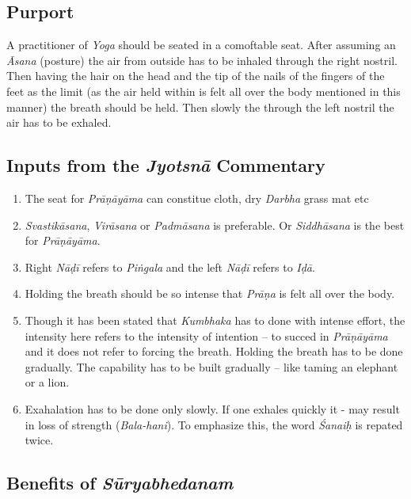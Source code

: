 \subsection*{Purport}

A practitioner of \textit{Yoga} should be seated in a comoftable seat. After assuming an \textit{Āsana} (posture) the air from outside has to be inhaled through the right nostril.  Then having the hair on the head and the tip of the nails of the fingers of the feet as the limit (as the air held within is felt all over the body mentioned in this manner) the breath should be held. Then slowly the through the left nostril the air has to be exhaled. 

\subsection*{Inputs from the \textit{Jyotsnā} Commentary}

\begin{enumerate}
\itemsep=0pt
\item The seat for \textit{Prāṇāyāma} can constitue cloth, dry \textit{Darbha} grass mat etc
\item \textit{Svastikāsana}, \textit{Virāsana} or \textit{Padmāsana} is preferable. Or \textit{Siddhāsana} is the best for \textit{Prāṇāyāma}. 
\item Right \textit{Nāḍī} refers to \textit{Piṅgala} and the left \textit{Nāḍī} refers to \textit{Iḍā}. 
\item Holding the breath should be so intense that \textit{Prāṇa} is felt all over the body. 
\item Though it has been stated that \textit{Kumbhaka} has to done with intense effort, the intensity here refers to the intensity of intention – to succed in \textit{Prāṇāyāma} and it does not refer to forcing the breath. Holding the breath has to be done gradually. The capability has to be built gradually – like taming an elephant or a lion. 
\item Exahalation has to be done only slowly. If one exhales quickly it - may result in loss of strength (\textit{Bala-hani}). To emphasize this, the word \textit{Śanaiḥ} is repated twice.       
\end{enumerate}
\newpage
	
\subsection*{Benefits of \textit{Sūryabhedanam}}


